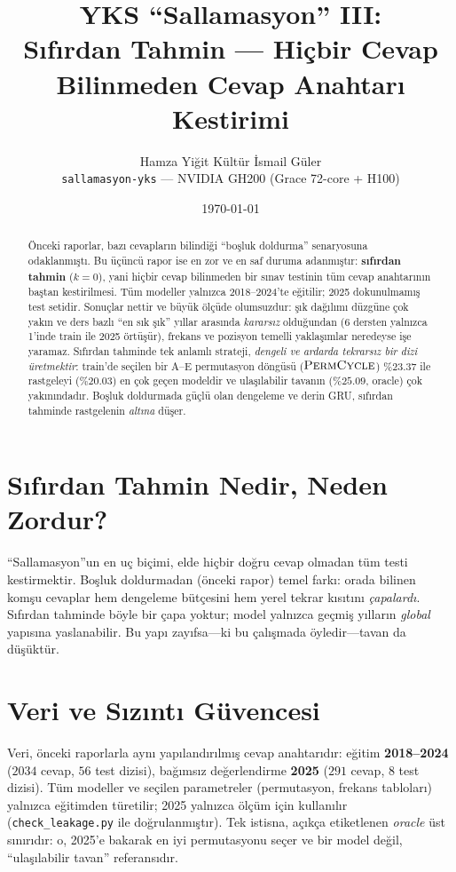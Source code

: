 \documentclass[11pt]{article}
\title{\textbf{YKS ``Sallamasyon'' III:\\
Sıfırdan Tahmin --- Hiçbir Cevap Bilinmeden Cevap Anahtarı Kestirimi}}
\author{Hamza Yiğit Kültür \quad\textbullet\quad İsmail Güler\\[2pt]
\small \texttt{sallamasyon-yks} --- NVIDIA GH200 (Grace 72-core + H100)}
\date{\today}
\begin{document}
\maketitle

\begin{abstract}
\noindent
Önceki raporlar, bazı cevapların bilindiği ``boşluk doldurma'' senaryosuna
odaklanmıştı. Bu üçüncü rapor ise en zor ve en saf duruma adanmıştır:
\textbf{sıfırdan tahmin} ($k=0$), yani hiçbir cevap bilinmeden bir sınav
testinin tüm cevap anahtarının baştan kestirilmesi. Tüm modeller yalnızca
2018--2024'te eğitilir; 2025 dokunulmamış test setidir. Sonuçlar nettir ve
büyük ölçüde olumsuzdur: şık dağılımı düzgüne çok yakın ve ders bazlı ``en sık
şık'' yıllar arasında \emph{kararsız} olduğundan (6 dersten yalnızca 1'inde
train ile 2025 örtüşür), frekans ve pozisyon temelli yaklaşımlar neredeyse
işe yaramaz. Sıfırdan tahminde tek anlamlı strateji, \emph{dengeli ve ardarda
tekrarsız bir dizi üretmektir}: train'de seçilen bir A--E permutasyon döngüsü
($\textsc{PermCycle}$) $\%23.37$ ile rastgeleyi ($\%20.03$) en çok geçen
modeldir ve ulaşılabilir tavanın ($\%25.09$, oracle) çok yakınındadır. Boşluk
doldurmada güçlü olan dengeleme ve derin GRU, sıfırdan tahminde rastgelenin
\emph{altına} düşer.
\end{abstract}

\section{Sıfırdan Tahmin Nedir, Neden Zordur?}
``Sallamasyon''un en uç biçimi, elde hiçbir doğru cevap olmadan tüm testi
kestirmektir. Boşluk doldurmadan (önceki rapor) temel farkı: orada bilinen
komşu cevaplar hem dengeleme bütçesini hem yerel tekrar kısıtını
\emph{çapalardı}. Sıfırdan tahminde böyle bir çapa yoktur; model yalnızca
geçmiş yılların \emph{global} yapısına yaslanabilir. Bu yapı zayıfsa---ki bu
çalışmada öyledir---tavan da düşüktür.

\section{Veri ve Sızıntı Güvencesi}
Veri, önceki raporlarla aynı yapılandırılmış cevap anahtarıdır: eğitim
\textbf{2018--2024} ($2034$ cevap, $56$ test dizisi), bağımsız değerlendirme
\textbf{2025} ($291$ cevap, $8$ test dizisi). Tüm modeller ve seçilen
parametreler (permutasyon, frekans tabloları) yalnızca eğitimden türetilir;
2025 yalnızca ölçüm için kullanılır (\texttt{check\_leakage.py} ile
doğrulanmıştır). Tek istisna, açıkça etiketlenen \emph{oracle} üst sınırıdır:
o, 2025'e bakarak en iyi permutasyonu seçer ve bir model değil, ``ulaşılabilir
tavan'' referansıdır.
\end{document}
